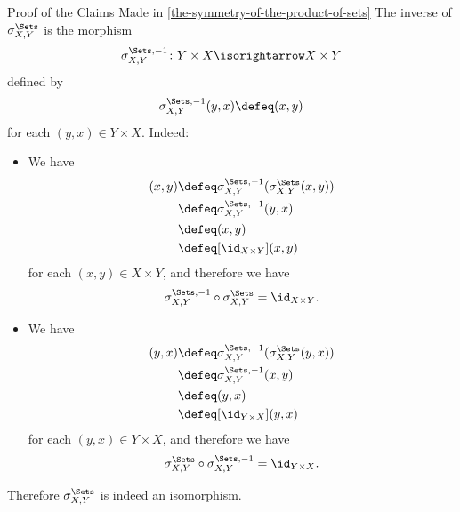 \begin{Proof}{Proof of the Claims Made in \cref{the-symmetry-of-the-product-of-sets}}%
    The inverse of $\sigma^{\Sets}_{X,Y}$ is the morphism
    \[
        \sigma^{\Sets,-1}_{X,Y}
        \colon
        Y\times X
        \isorightarrow
        X\times Y
    \]%
    defined by
    \[
        \sigma^{\Sets,-1}_{X,Y}(y,x)%
        \defeq%
        (x,y)
    \]%
    for each $(y,x)\in Y\times X$. Indeed:
    \begin{itemize}
        \item{}We have
            \begin{align*}
                [\sigma^{\Sets,-1}_{X,Y}\circ\sigma^{\Sets}_{X,Y}](x,y) &\defeq \sigma^{\Sets,-1}_{X,Y}(\sigma^{\Sets}_{X,Y}(x,y))\\
                                                                        &\defeq \sigma^{\Sets,-1}_{X,Y}(y,x)\\
                                                                        &\defeq (x,y)\\
                                                                        &\defeq [\id_{X\times Y}](x,y)
            \end{align*}
            for each $(x,y)\in X\times Y$, and therefore we have
            \[
                \sigma^{\Sets,-1}_{X,Y}\circ\sigma^{\Sets}_{X,Y}%
                =%
                \id_{X\times Y}.%
            \]%
        \item{}We have
            \begin{align*}
                [\sigma^{\Sets}_{X,Y}\circ\sigma^{\Sets,-1}_{X,Y}](y,x) &\defeq \sigma^{\Sets,-1}_{X,Y}(\sigma^{\Sets}_{X,Y}(y,x))\\
                                                                        &\defeq \sigma^{\Sets,-1}_{X,Y}(x,y)\\
                                                                        &\defeq (y,x)\\
                                                                        &\defeq [\id_{Y\times X}](y,x)
            \end{align*}
            for each $(y,x)\in Y\times X$, and therefore we have
            \[
                \sigma^{\Sets}_{X,Y}\circ\sigma^{\Sets,-1}_{X,Y}%
                =%
                \id_{Y\times X}.%
            \]%
    \end{itemize}
    Therefore $\sigma^{\Sets}_{X,Y}$ is indeed an isomorphism.


\end{Proof}
